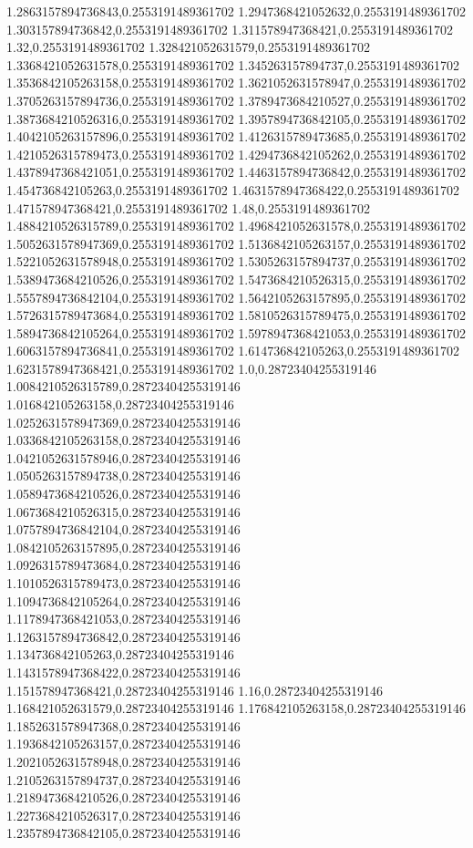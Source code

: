 1.2863157894736843,0.2553191489361702
1.2947368421052632,0.2553191489361702
1.303157894736842,0.2553191489361702
1.311578947368421,0.2553191489361702
1.32,0.2553191489361702
1.328421052631579,0.2553191489361702
1.3368421052631578,0.2553191489361702
1.345263157894737,0.2553191489361702
1.3536842105263158,0.2553191489361702
1.3621052631578947,0.2553191489361702
1.3705263157894736,0.2553191489361702
1.3789473684210527,0.2553191489361702
1.3873684210526316,0.2553191489361702
1.3957894736842105,0.2553191489361702
1.4042105263157896,0.2553191489361702
1.4126315789473685,0.2553191489361702
1.4210526315789473,0.2553191489361702
1.4294736842105262,0.2553191489361702
1.4378947368421051,0.2553191489361702
1.4463157894736842,0.2553191489361702
1.454736842105263,0.2553191489361702
1.4631578947368422,0.2553191489361702
1.471578947368421,0.2553191489361702
1.48,0.2553191489361702
1.4884210526315789,0.2553191489361702
1.4968421052631578,0.2553191489361702
1.5052631578947369,0.2553191489361702
1.5136842105263157,0.2553191489361702
1.5221052631578948,0.2553191489361702
1.5305263157894737,0.2553191489361702
1.5389473684210526,0.2553191489361702
1.5473684210526315,0.2553191489361702
1.5557894736842104,0.2553191489361702
1.5642105263157895,0.2553191489361702
1.5726315789473684,0.2553191489361702
1.5810526315789475,0.2553191489361702
1.5894736842105264,0.2553191489361702
1.5978947368421053,0.2553191489361702
1.6063157894736841,0.2553191489361702
1.614736842105263,0.2553191489361702
1.6231578947368421,0.2553191489361702
1.0,0.28723404255319146
1.0084210526315789,0.28723404255319146
1.016842105263158,0.28723404255319146
1.0252631578947369,0.28723404255319146
1.0336842105263158,0.28723404255319146
1.0421052631578946,0.28723404255319146
1.0505263157894738,0.28723404255319146
1.0589473684210526,0.28723404255319146
1.0673684210526315,0.28723404255319146
1.0757894736842104,0.28723404255319146
1.0842105263157895,0.28723404255319146
1.0926315789473684,0.28723404255319146
1.1010526315789473,0.28723404255319146
1.1094736842105264,0.28723404255319146
1.1178947368421053,0.28723404255319146
1.1263157894736842,0.28723404255319146
1.134736842105263,0.28723404255319146
1.1431578947368422,0.28723404255319146
1.151578947368421,0.28723404255319146
1.16,0.28723404255319146
1.168421052631579,0.28723404255319146
1.176842105263158,0.28723404255319146
1.1852631578947368,0.28723404255319146
1.1936842105263157,0.28723404255319146
1.2021052631578948,0.28723404255319146
1.2105263157894737,0.28723404255319146
1.2189473684210526,0.28723404255319146
1.2273684210526317,0.28723404255319146
1.2357894736842105,0.28723404255319146
